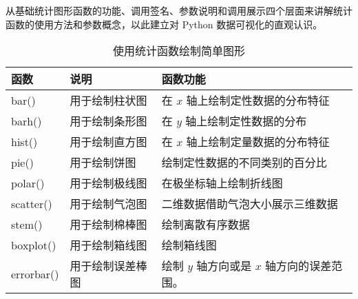 \chapter{\label{ch02}}
从基础统计图形函数的功能、调用签名、参数说明和调用展示四个层面来讲解统计函数的使用方法和参数概念，以此建立对 Python 数据可视化的直观认识。
\begin{table}[h]
    \centering
    \caption{使用统计函数绘制简单图形}
    \label{tbl2-1}
    \begin{tabularx}{\textwidth}{llX}
        \hline
        函数         & 说明       & 函数功能                       \\
        \hline
        bar()      & 用于绘制柱状图  & 在 $x$ 轴上绘制定性数据的分布特征        \\
        barh()     & 用于绘制条形图  & 在 $y$ 轴上绘制定性数据的分布          \\
        hist()     & 用于绘制直方图  & 在 $x$ 轴上绘制定量数据的分布特征        \\
        pie()      & 用于绘制饼图   & 绘制定性数据的不同类别的百分比            \\
        polar()    & 用于绘制极线图  & 在极坐标轴上绘制折线图                \\
        scatter()  & 用于绘制气泡图  & 二维数据借助气泡大小展示三维数据           \\
        stem()     & 用于绘制棉棒图  & 绘制离散有序数据                   \\
        boxplot()  & 用于绘制箱线图  & 绘制箱线图                      \\
        errorbar() & 用于绘制误差棒图 & 绘制 $y$ 轴方向或是 $x$ 轴方向的误差范围。 \\
        \hline
    \end{tabularx}
\end{table}
